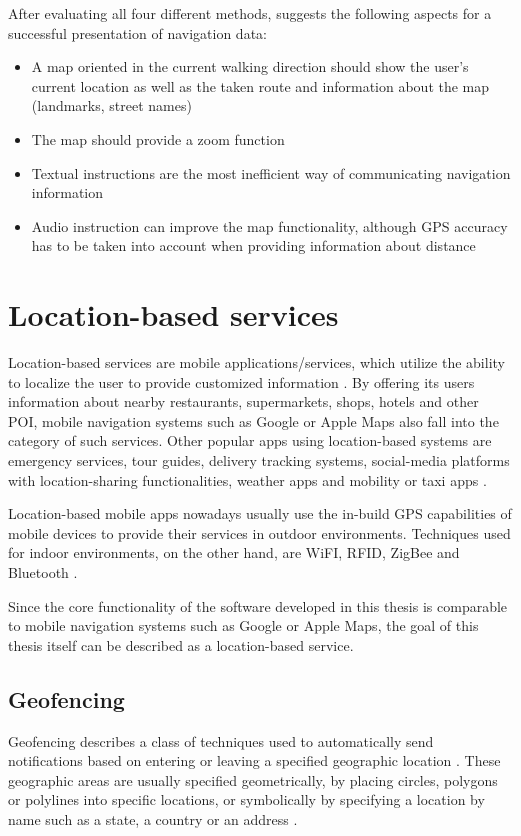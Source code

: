 After evaluating all four different methods, \cite{visual_design_of_navigation_system} suggests the following aspects for a successful presentation of navigation data:

\begin{itemize}
    \item A map oriented in the current walking direction should show the user's current location as well as the taken route and information about the map (landmarks, street names)
    \item The map should provide a zoom function
    \item Textual instructions are the most inefficient way of communicating navigation information
    \item Audio instruction can improve the map functionality, although GPS accuracy has to be taken into account when providing information about distance
\end{itemize}

\section{Location-based services}
Location-based services are mobile applications/services, which utilize the ability to localize the user to provide customized information \cite{location_based_services}. By offering its users information about nearby restaurants, supermarkets, shops, hotels and other POI, mobile navigation systems such as Google \cite{google_maps_website} or Apple Maps \cite{apple_maps_website} also fall into the category of such services. Other popular apps using location-based systems are emergency services, tour guides, delivery tracking systems, social-media platforms with location-sharing functionalities, weather apps and mobility or taxi apps \cite{geofencing_and_background_tracking} \cite{Sadhukhan2021}.

Location-based mobile apps nowadays usually use the in-build GPS capabilities of mobile devices to provide their services in outdoor environments. Techniques used for indoor environments, on the other hand, are WiFI, RFID, ZigBee and Bluetooth \cite{Sadhukhan2021}.

Since the core functionality of the software developed in this thesis is comparable to mobile navigation systems such as Google or Apple Maps, the goal of this thesis itself can be described as a location-based service.

\subsection{Geofencing}
Geofencing describes a class of techniques used to automatically send notifications based on entering or leaving a specified geographic location \cite{geofencing}. These geographic areas are usually specified geometrically, by placing circles, polygons or polylines into specific locations, or symbolically by specifying a location by name such as a state, a country or an address \cite{geofencing}.

